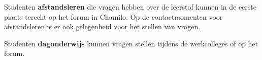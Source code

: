 Studenten \textbf{afstandsleren} die vragen hebben over de leerstof kunnen in de eerste plaats terecht op het forum in Chamilo. Op de contactmomenten voor afstandsleren is er ook gelegenheid voor het stellen van vragen.

Studenten \textbf{dagonderwijs} kunnen vragen stellen tijdens de werkcolleges of  op het forum.



